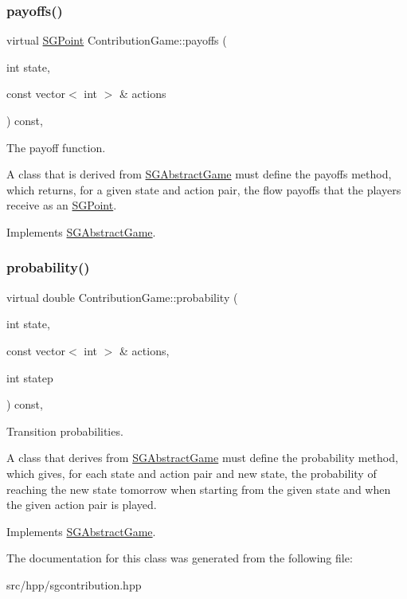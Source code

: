 \subsubsection{\texorpdfstring{payoffs()}{payoffs()}}
{\footnotesize\ttfamily virtual \hyperlink{classSGPoint}{S\+G\+Point} Contribution\+Game\+::payoffs (\begin{DoxyParamCaption}\item[{int}]{state,  }\item[{const vector$<$ int $>$ \&}]{actions }\end{DoxyParamCaption}) const\hspace{0.3cm}{\ttfamily [inline]}, {\ttfamily [virtual]}}



The payoff function. 

A class that is derived from \hyperlink{classSGAbstractGame}{S\+G\+Abstract\+Game} must define the payoffs method, which returns, for a given state and action pair, the flow payoffs that the players receive as an \hyperlink{classSGPoint}{S\+G\+Point}. 

Implements \hyperlink{classSGAbstractGame_a3fc1cd009d1813f44f1f219e7deb6eef}{S\+G\+Abstract\+Game}.

\mbox{\label{classContributionGame_a7b5ca7f6f0119f5899784ceae570666d}} 
\subsubsection{\texorpdfstring{probability()}{probability()}}
{\footnotesize\ttfamily virtual double Contribution\+Game\+::probability (\begin{DoxyParamCaption}\item[{int}]{state,  }\item[{const vector$<$ int $>$ \&}]{actions,  }\item[{int}]{statep }\end{DoxyParamCaption}) const\hspace{0.3cm}{\ttfamily [inline]}, {\ttfamily [virtual]}}



Transition probabilities. 

A class that derives from \hyperlink{classSGAbstractGame}{S\+G\+Abstract\+Game} must define the probability method, which gives, for each state and action pair and new state, the probability of reaching the new state tomorrow when starting from the given state and when the given action pair is played. 

Implements \hyperlink{classSGAbstractGame_a416b31d5020b75de49447ce4f7783b98}{S\+G\+Abstract\+Game}.



The documentation for this class was generated from the following file\+:\begin{DoxyCompactItemize}
\item 
src/hpp/sgcontribution.\+hpp\end{DoxyCompactItemize}
